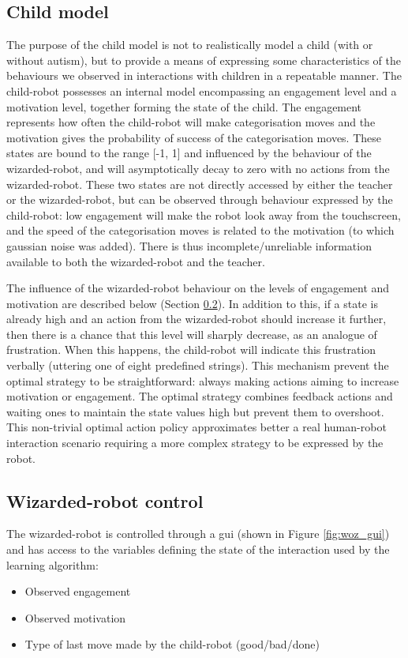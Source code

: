\subsection{Child model} \label{ssec:woz_child}

The purpose of the child model is not to realistically model a child (with or without autism), but to provide a means of expressing some characteristics of the behaviours we observed in interactions with children in a repeatable manner. The child-robot possesses an internal model encompassing an engagement level and a motivation level, together forming the state of the child. The engagement represents how often the child-robot will make categorisation moves and the motivation gives the probability of success of the categorisation moves. These states are bound to the range [-1, 1] and influenced by the behaviour of the wizarded-robot, and will asymptotically decay to zero with no actions from the wizarded-robot. These two states are not directly accessed by either the teacher or the wizarded-robot, but can be observed through behaviour expressed by the child-robot: low engagement will make the robot look away from the touchscreen, and the speed of the categorisation moves is related to the motivation (to which gaussian noise was added). There is thus incomplete/unreliable information available to both the wizarded-robot and the teacher.

The influence of the wizarded-robot behaviour on the levels of engagement and motivation are described below (Section \ref{ssec:woz_wizarded_robot}). In addition to this, if a state is already high and an action from the wizarded-robot should increase it further, then there is a chance that this level will sharply decrease, as an analogue of frustration. When this happens, the child-robot will indicate this frustration verbally (uttering one of eight predefined strings). This mechanism prevent the optimal strategy to be straightforward: always making actions aiming to increase motivation or engagement. The optimal strategy combines feedback actions and waiting ones to maintain the state values high but prevent them to overshoot. This non-trivial optimal action policy approximates better a real human-robot interaction scenario requiring a more complex strategy to be expressed by the robot.

\subsection{Wizarded-robot control}
\label{ssec:woz_wizarded_robot}
The wizarded-robot is controlled through a \gls{gui} (shown in Figure \ref{fig:woz_gui}) and has access to the variables defining the state of the interaction used by the learning algorithm:
\begin{itemize}
	\item Observed engagement
	\item Observed motivation
	\item Type of last move made by the child-robot (good/bad/done)
\end{itemize}


